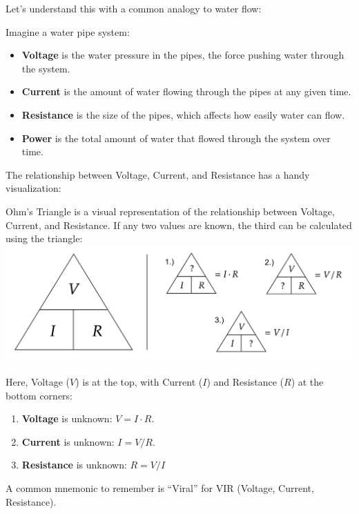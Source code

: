 \newpage 

\noindent
Let's understand this with a common analogy to water flow:

\begin{Example}

    \noindent
    Imagine a water pipe system:
    \begin{itemize}
        \item \textbf{Voltage} is the water pressure in the pipes, the force pushing water through the system.
        \item \textbf{Current} is the amount of water flowing through the pipes at any given time.
        \item \textbf{Resistance} is the size of the pipes, which affects how easily water can flow.
        \item \textbf{Power} is the total amount of water that flowed through the system over time.
    \end{itemize}
\end{Example}


\noindent
The relationship between Voltage, Current, and Resistance has a handy visualization:

\begin{Def}

    \label{def:ohms_triangle}

    \noindent
    Ohm's Triangle is a visual representation of the relationship between Voltage, Current, and Resistance. 
    If any two values are known, the third can be calculated using the triangle:\\

\noindent
    \includegraphics[width=\textwidth]{./Sections/circuits/triangle.png}

    \noindent
    Here, Voltage ($V$) is at the top, with Current ($I$) and Resistance ($R$) at the bottom corners:
    \begin{enumerate}
        \item \textbf{Voltage} is unknown: $V = I \cdot R$.
        \item \textbf{Current} is unknown: $I = V / R$.
        \item \textbf{Resistance} is unknown: $R = V / I$
    \end{enumerate}

    \noindent
    A common mnemonic to remember is ``Viral'' for VIR (Voltage, Current, Resistance).
\end{Def}

